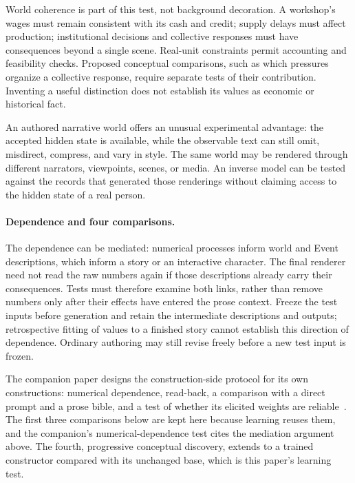 \documentclass[10pt]{article}
\begin{document}
World coherence is part of this test, not background decoration. A workshop's
wages must remain consistent with its cash and credit; supply delays must
affect production; institutional decisions and collective responses must have
consequences beyond a single scene. Real-unit constraints permit accounting
and feasibility checks. Proposed conceptual comparisons, such as which
pressures organize a collective response, require separate tests of their
contribution. Inventing a useful distinction does not establish its values as
economic or historical fact.

An authored narrative world offers an unusual experimental advantage: the
accepted hidden state is available, while the observable text can still omit,
misdirect, compress, and vary in style. The same world may be rendered through
different narrators, viewpoints, scenes, or media. An inverse model can be
tested against the records that generated those renderings without claiming
access to the hidden state of a real person.

\paragraph{Dependence and four comparisons.}
The dependence can be mediated: numerical processes inform world and Event
descriptions, which inform a story or an interactive character. The final
renderer need not read the raw numbers again if those descriptions already
carry their consequences. Tests must therefore examine both links, rather
than remove numbers only after their effects have entered the prose context.
Freeze the test inputs before generation and retain the intermediate
descriptions and outputs; retrospective fitting of values to a finished story
cannot establish this direction of dependence. Ordinary authoring may still
revise freely before a new test input is frozen.

The companion paper designs the construction-side protocol for its own
constructions: numerical dependence, read-back, a comparison with a direct
prompt and a prose bible, and a test of whether its elicited weights are
reliable~\cite{westerbergMeaning2026}. The first three comparisons below are
kept here because learning reuses them, and the companion's
numerical-dependence test cites the mediation argument above. The fourth,
progressive conceptual discovery, extends to a trained constructor compared
with its unchanged base, which is this paper's learning test.
\end{document}

